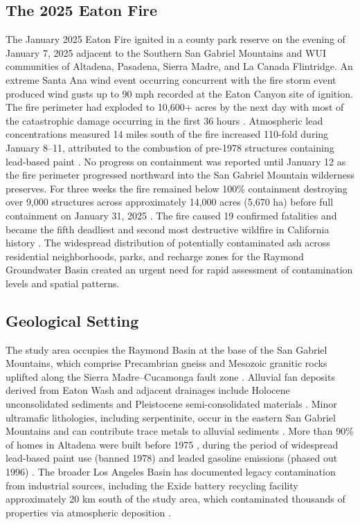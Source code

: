 \documentclass[12pt,letterpaper]{article}
\begin{document}
\subsection{The 2025 Eaton Fire}
The January 2025 Eaton Fire ignited in a county park reserve on the evening of January 7, 2025 adjacent to the Southern San Gabriel Mountains and WUI communities of Altadena, Pasadena, Sierra Madre, and La Canada Flintridge. An extreme Santa Ana wind event occurring concurrent with the fire storm event produced wind gusts up to 90 mph recorded at the Eaton Canyon site of ignition. The fire perimeter had exploded to 10,600+ acres by the next day with most of the catastrophic damage occurring in the first 36 hours \citep{CALFIRE2025}. Atmospheric lead concentrations measured 14 miles south of the fire increased 110-fold during January 8--11, attributed to the combustion of pre-1978 structures containing lead-based paint \citep{CDC_MMWR_2025}. No progress on containment was reported until January 12 as the fire perimeter progressed northward into the San Gabriel Mountain wilderness preserves. For three weeks the fire remained below 100\% containment destroying over 9,000 structures across approximately 14,000 acres (5,670 ha) before full containment on January 31, 2025 \citep{CALFIRE2025}. The fire caused 19 confirmed fatalities and became the fifth deadliest and second most destructive wildfire in California history \citep{CALFIRE2025}. The widespread distribution of potentially contaminated ash across residential neighborhoods, parks, and recharge zones for the Raymond Groundwater Basin created an urgent need for rapid assessment of contamination levels and spatial patterns. 

\subsection{Geological Setting}
The study area occupies the Raymond Basin at the base of the San Gabriel Mountains, which comprise Precambrian gneiss and Mesozoic granitic rocks uplifted along the Sierra Madre--Cucamonga fault zone \citep{Yerkes1985, Morton2014}. Alluvial fan deposits derived from Eaton Wash and adjacent drainages include Holocene unconsolidated sediments and Pleistocene semi-consolidated materials \citep{Morton2014}. Minor ultramafic lithologies, including serpentinite, occur in the eastern San Gabriel Mountains and can contribute trace metals to alluvial sediments \citep{Oze2004, Fendorf2023}. More than 90\% of homes in Altadena were built before 1975 \citep{USCensus2020}, during the period of widespread lead-based paint use (banned 1978) and leaded gasoline emissions (phased out 1996) \citep{Mielke1999}. The broader Los Angeles Basin has documented legacy contamination from industrial sources, including the Exide battery recycling facility approximately 20 km south of the study area, which contaminated thousands of properties via atmospheric deposition \citep{DTSC2020}.
\end{document}
